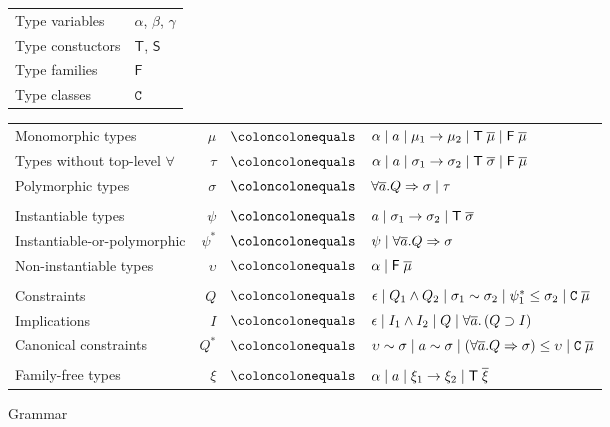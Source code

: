 \documentclass[12pt]{article}
\begin{document}
\begin{figure}[h]
\begin{mdframed}
\noindent \begin{tabular}{ll}
Type variables & $\alpha$, $\beta$, $\gamma$ \\
Type constuctors & $\mathsf{T}$, $\mathsf{S}$ \\
Type families & $\mathsf{F}$ \\
Type classes & $\mathtt{C}$
\end{tabular}

\vspace{0.3cm}

\noindent \begin{tabular}{lrcl}
Monomorphic types & $\mu$ & $\coloncolonequals$ & $\alpha \; | \; a \; | \; \mu_1 \to \mu_2 \; | \; \mathsf{T} \; \overline{\mu} \; | \; \mathsf{F} \; \overline{\mu}$ \\
Types without top-level $\forall$ & $\tau$ & $\coloncolonequals$ & $\alpha \; | \; a \; | \; \sigma_1 \to \sigma_2 \; | \; \mathsf{T} \; \overline{\sigma} \; | \; \mathsf{F} \; \overline{\mu}$ \\
Polymorphic types & $\sigma$ & $\coloncolonequals$ & $\forall \overline{a}. Q \Rightarrow \sigma \; | \; \tau$ \\
\\
Instantiable types & $\psi$ & $\coloncolonequals$ & $a \; | \; \sigma_1 \to \sigma_2 \; | \; \mathsf{T} \; \overline{\sigma}$ \\
Instantiable-or-polymorphic & $\psi^*$ & $\coloncolonequals$ & $\psi \; | \; \forall \overline{a}. Q \Rightarrow \sigma$ \\
Non-instantiable types & $\upsilon$ & $\coloncolonequals$ & $\alpha \; | \; \mathsf{F} \; \overline{\mu}$ \\
\\
Constraints & $Q$ & $\coloncolonequals$ & $\epsilon \; | \; Q_1 \wedge Q_2 \; | \; \sigma_1 \sim \sigma_2 \; | \; \psi^*_1 \leq \sigma_2 \; | \; \mathtt{C} \; \overline{\mu}$ \\
Implications & $I$ & $\coloncolonequals$ & $\epsilon \; | \; I_1 \wedge I_2 \; | \; Q \; | \; \forall \overline{a}. \, (Q \supset I)$ \\
Canonical constraints & $Q^*$ & $\coloncolonequals$ & $\upsilon \sim \sigma \; | \; a \sim \sigma \; | \; (\forall \overline{a}. Q \Rightarrow \sigma) \leq \upsilon \; | \; \mathtt{C} \; \overline{\mu}$ \\
\\
Family-free types & $\xi$ & $\coloncolonequals$ & $\alpha \; | \; a \; | \; \xi_1 \to \xi_2 \; | \; \mathsf{T} \; \overline{\xi}$
\end{tabular}
\end{mdframed}
\caption{Grammar}
\label{types}
\end{figure}
\end{document}
